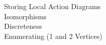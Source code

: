 \documentclass[preview]{standalone}
\begin{document}
Storing Local Action Diagrams\\Isomorphisms\\Discreteness\\Enumerating (1 and 2 Vertices)\\
\end{document}
